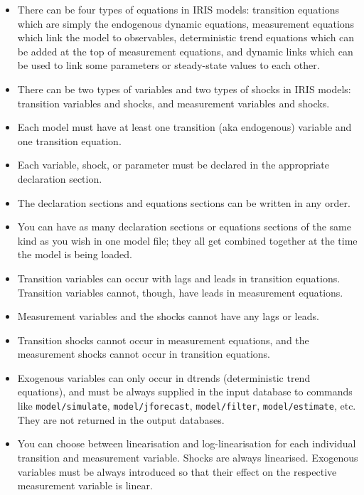 \begin{itemize}
\item
  There can be four types of equations in IRIS models: transition
  equations which are simply the endogenous dynamic equations,
  measurement equations which link the model to observables,
  deterministic trend equations which can be added at the top of
  measurement equations, and dynamic links which can be used to link
  some parameters or steady-state values to each other.
\item
  There can be two types of variables and two types of shocks in IRIS
  models: transition variables and shocks, and measurement variables and
  shocks.
\item
  Each model must have at least one transition (aka endogenous) variable
  and one transition equation.
\item
  Each variable, shock, or parameter must be declared in the appropriate
  declaration section.
\item
  The declaration sections and equations sections can be written in any
  order.
\item
  You can have as many declaration sections or equations sections of the
  same kind as you wish in one model file; they all get combined
  together at the time the model is being loaded.
\item
  Transition variables can occur with lags and leads in transition
  equations. Transition variables cannot, though, have leads in
  measurement equations.
\item
  Measurement variables and the shocks cannot have any lags or leads.
\item
  Transition shocks cannot occur in measurement equations, and the
  measurement shocks cannot occur in transition equations.
\item
  Exogenous variables can only occur in dtrends (deterministic trend
  equations), and must be always supplied in the input database to
  commands like \texttt{model/simulate}, \texttt{model/jforecast},
  \texttt{model/filter}, \texttt{model/estimate}, etc. They are not
  returned in the output databases.
\item
  You can choose between linearisation and log-linearisation for each
  individual transition and measurement variable. Shocks are always
  linearised. Exogenous variables must be always introduced so that
  their effect on the respective measurement variable is linear.
\end{itemize}



